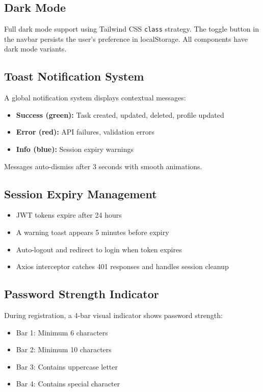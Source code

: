\documentclass[12pt, a4paper]{article}
\begin{document}
\subsection{Dark Mode}

Full dark mode support using Tailwind CSS \texttt{class} strategy. The toggle button in the navbar persists the user's preference in localStorage. All components have dark mode variants.

\subsection{Toast Notification System}

A global notification system displays contextual messages:
\begin{itemize}[nosep]
    \item \textbf{Success (green):} Task created, updated, deleted, profile updated
    \item \textbf{Error (red):} API failures, validation errors
    \item \textbf{Info (blue):} Session expiry warnings
\end{itemize}
Messages auto-dismiss after 3 seconds with smooth animations.

\subsection{Session Expiry Management}

\begin{itemize}[nosep]
    \item JWT tokens expire after 24 hours
    \item A warning toast appears 5 minutes before expiry
    \item Auto-logout and redirect to login when token expires
    \item Axios interceptor catches 401 responses and handles session cleanup
\end{itemize}

\subsection{Password Strength Indicator}

During registration, a 4-bar visual indicator shows password strength:
\begin{itemize}[nosep]
    \item Bar 1: Minimum 6 characters
    \item Bar 2: Minimum 10 characters
    \item Bar 3: Contains uppercase letter
    \item Bar 4: Contains special character
\end{itemize}
\end{document}
